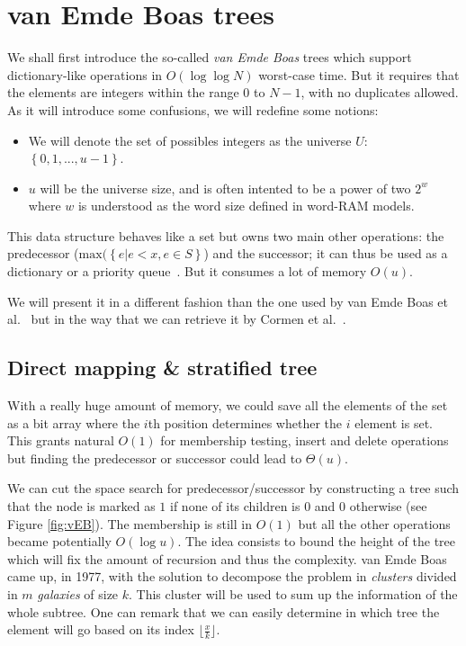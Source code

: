 
\section{van Emde Boas trees}

We shall first introduce the so-called \textit{van Emde Boas} trees which support dictionary-like operations in $O(\log \log N)$ worst-case time. But it requires that the elements are integers within the range $0$ to $N-1$, with no duplicates allowed. As it will introduce some confusions, we will redefine some notions:

\begin{itemize}
    \item We will denote the set of possibles integers as the universe $U$: $\left\{ 0, 1, ..., u - 1\right\}$.
    \item $u$ will be the universe size, and is often intented to be a power of two $2^{w}$ where $w$ is understood as the word size defined in word-RAM models.
\end{itemize}

This data structure behaves like a set but owns two main other operations: the predecessor ($\text{max}(\left\{e | e < x, e \in S\right\}$) and the successor; it can thus be used as a dictionary or a priority queue~\cite{van1976design}. But it consumes a lot of memory $O(u)$.

We will present it in a different fashion than the one used by van Emde Boas et al.~\cite{van1976design} but in the way that we can retrieve it by Cormen et al.~\cite{cormen2009introduction}.

\subsection{Direct mapping \& stratified tree}

With a really huge amount of memory, we could save all the elements of the set as a bit array where the $i$th position determines whether the $i$ element is set. This grants natural $O(1)$ for membership testing, insert and delete operations but finding the predecessor or successor could lead to $\Theta(u)$.

We can cut the space search for predecessor/successor by constructing a tree such that the node is marked as $1$ if none of its children is $0$ and $0$ otherwise (see Figure \ref{fig:vEB}). The membership is still in $O(1)$ but all the other operations became potentially $O(\log u)$. The idea consists to bound the height of the tree which will fix the amount of recursion and thus the complexity. van Emde Boas~\cite{van1977preserving} came up, in 1977, with the solution to decompose the problem in \textit{clusters} divided in $m$ \textit{galaxies} of size $k$. This cluster will be used to sum up the information of the whole subtree. One can remark that we can easily determine in which tree the element will go based on its index $\lfloor \frac{x}{k} \rfloor$.

